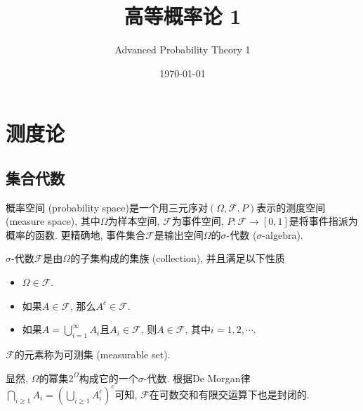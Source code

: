 \documentclass[cn, 12pt, math=mtpro2, bibstyle=apa, blue, twocol]{elegantbook}
\title{高等概率论 1}
\subtitle{Advanced Probability Theory 1}
\date{\today}
\newcommand{\F}{\mathcal{F}}
\newcommand{\PP}{P}
\begin{document}
\maketitle
\frontmatter

\tableofcontents

\mainmatter

\chapter{测度论}
\section{集合代数}

概率空间 (probability space)是一个用三元序对$(\Omega,\F,\PP)$表示的测度空间 (measure space), 其中$\Omega$为样本空间, $\F$为事件空间, $\PP:\F\to[0,1]$是将事件指派为概率的函数. 更精确地, 事件集合$\F$是输出空间$\Omega$的$\sigma$-代数 ($\sigma$-algebra).

\begin{definition}
$\sigma$-代数$\F$是由$\Omega$的子集构成的集族 (collection), 并且满足以下性质
\begin{itemize}
  \item $\Omega\in\F$.
  \item 如果$A\in\F$, 那么$A^c\in\F$.
  \item 如果$A=\bigcup_{i=1}^\infty A_i$且$A_i\in\F$, 则$A\in\F$, 其中$i=1,2,\cdots$.
\end{itemize}
$\F$的元素称为可测集 (measurable set).
\end{definition}

显然, $\Omega$的幂集$2^\Omega$构成它的一个$\sigma$-代数. 根据De Morgan律$\bigcap_{i\ge1} A_i=(\bigcup_{i\ge1} A_i^c)^c$可知, $\F$在可数交和有限交运算下也是封闭的.
\end{document}
